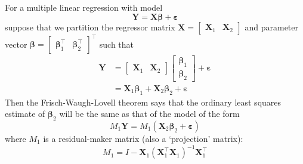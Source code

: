 \documentclass[11pt]{report} %
\begin{document}
For a multiple linear regression with model
\begin{equation}
\mathbf{Y} = \mathbf{X}\boldsymbol{\beta} + \boldsymbol{\varepsilon}
\end{equation}
suppose that we partition the regressor matrix $\mathbf{X} = \begin{bmatrix} \mathbf{X}_{1} & \mathbf{X}_{2} \end{bmatrix}$ and parameter vector $\boldsymbol{\beta} = \begin{bmatrix} \boldsymbol{\beta}_{1}^{\top} & \boldsymbol{\beta}_{2}^{\top}\end{bmatrix}^{\top}$ such that
\begin{align}
\mathbf{Y} &= \begin{bmatrix} \mathbf{X}_{1} & \mathbf{X}_{2} \end{bmatrix}\begin{bmatrix} \boldsymbol{\beta}_{1} \\ \boldsymbol{\beta}_{2}\end{bmatrix} + \boldsymbol{\varepsilon} \\
&= \mathbf{X}_{1}\boldsymbol{\beta}_{1} + \mathbf{X}_{2}\boldsymbol{\beta}_{2} + \boldsymbol{\varepsilon}
\end{align}
Then the Frisch-Waugh-Lovell theorem says that the ordinary least squares estimate of $\boldsymbol{\beta}_{2}$ will be the same as that of the model of the form
\begin{equation}
M_{1}\mathbf{Y} = M_{1}\left(\mathbf{X}_{2}\boldsymbol{\beta}_{2} + \boldsymbol{\varepsilon}\right)
\end{equation}
where $M_{1}$ is a residual-maker matrix (also a `projection' matrix):
\begin{equation}
M_{1} = I - \mathbf{X}_{1}\left(\mathbf{X}_{1}^{\top}\mathbf{X}_{1}\right)^{-1}\mathbf{X}_{1}^{\top}
\end{equation}
\end{document}
